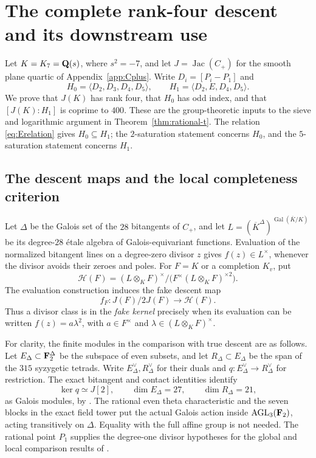 \section{The complete rank-four descent and its downstream use}
\label{app:rank-proof}

Let $K=K_7=\mathbf Q(s)$, where $s^2=-7$, and let
$J=\operatorname{Jac}(C_+)$ for the smooth plane quartic of
Appendix~\ref{app:Cplus}.  Write $D_i=[P_i-P_1]$ and
\[
 H_0=\langle D_2,D_3,D_4,D_5\rangle,\qquad
 H_1=\langle D_2,E,D_4,D_5\rangle.
\]
We prove that $J(K)$ has rank four, that $H_0$ has odd index, and that
$[J(K):H_1]$ is coprime to $400$.  These are the group-theoretic inputs
to the sieve and logarithmic argument in Theorem~\ref{thm:rational-t}.
The relation \eqref{eq:Erelation} gives $H_0\subseteq H_1$; the
$2$-saturation statement concerns $H_0$, and the $5$-saturation statement
concerns $H_1$.

\subsection{The descent maps and the local completeness criterion}

Let $\Delta$ be the Galois set of the $28$ bitangents of $C_+$, and let
$L=(\overline K^{\Delta})^{\operatorname{Gal}(\overline K/K)}$
be its degree-$28$ \'etale algebra of Galois-equivariant functions.  Evaluation of
the normalized bitangent lines on a degree-zero divisor $z$ gives
$f(z)\in L^\times$, whenever the divisor avoids their zeroes and poles.
For $F=K$ or a completion $K_v$, put
\[
 \mathcal H(F)=
 (L\otimes_K F)^\times\big/
       \bigl(F^\times(L\otimes_K F)^{\times2}\bigr).
\]
The evaluation construction induces the fake descent map
\[
 f_F:J(F)/2J(F)\longrightarrow\mathcal H(F).
\]
Thus a divisor class is in the \emph{fake kernel} precisely when its
evaluation can be written $f(z)=a\lambda^2$, with $a\in F^\times$
and $\lambda\in(L\otimes_K F)^\times$.

For clarity, the finite modules in the comparison with true descent are
as follows.  Let $E_\Delta\subset\mathbf F_2^\Delta$ be the subspace of even subsets,
and let $R_\Delta\subset E_\Delta$ be the span of the $315$ syzygetic tetrads.
Write $E_\Delta^\vee,R_\Delta^\vee$ for their duals and
$q:E_\Delta^\vee\to R_\Delta^\vee$ for restriction.  The exact bitangent and
contact identities identify
\[
 \ker q\simeq J[2],\qquad \dim E_\Delta=27,\qquad \dim R_\Delta=21,
\]
as Galois modules, by \cite[Corollary~12.5]{BPS}.  The rational even
theta characteristic and the seven blocks in the exact field tower put
the actual Galois action inside $\operatorname{AGL}_3(\mathbf F_2)$, acting
transitively on $\Delta$.  Equality with the full affine group is not
needed.  The rational point $P_1$ supplies the degree-one divisor
hypotheses for the global and local comparison results of
\cite[Lemma~10.2 and Appendix~A]{BPS}.

